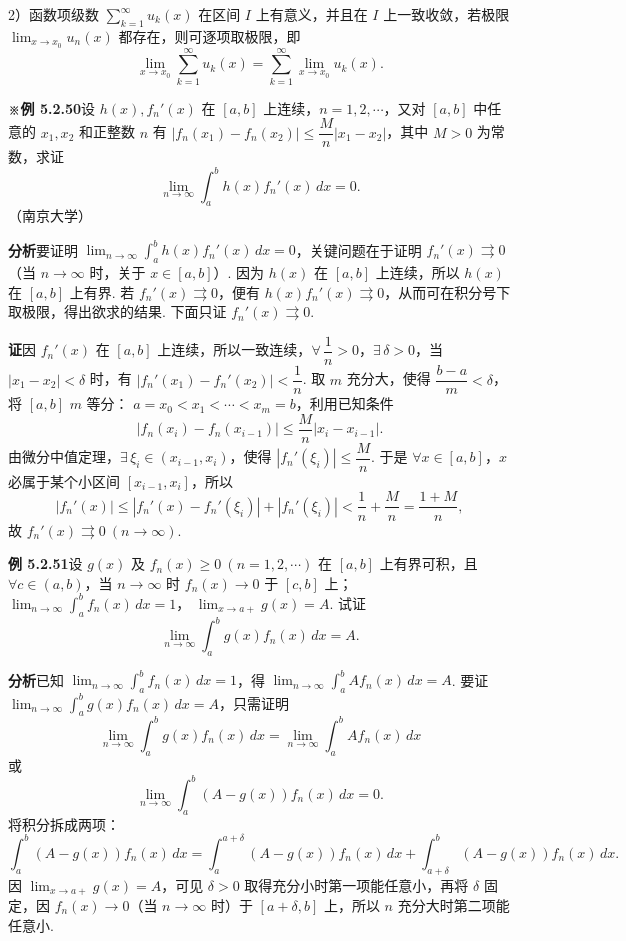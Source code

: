 \documentclass[UTF8, 12pt, fontset=fandol, oneside]{ctexart}
\begin{document}
2）函数项级数 $\displaystyle\sum_{k=1}^{\infty}u_k(x)$ 在区间 $I$ 上有意义，并且在 $I$ 上一致收敛，若极限
$\displaystyle\lim_{x\to x_0}u_n(x)$ 都存在，则可逐项取极限，即
\[
  \lim_{x\to x_0}\sum_{k=1}^{\infty}u_k(x)
  =\sum_{k=1}^{\infty}\lim_{x\to x_0}u_k(x).
\tag{C}
\]

\noindent\textbf{※例 5.2.50}\quad 设 $h(x),f_n'(x)$ 在 $[a,b]$ 上连续，$n=1,2,\cdots$，又对 $[a,b]$ 中任意的
$x_1,x_2$ 和正整数 $n$ 有
$|f_n(x_1)-f_n(x_2)|\le\dfrac Mn|x_1-x_2|$，其中 $M>0$ 为常数，求证
\[
  \lim_{n\to\infty}\int_a^b h(x)f_n'(x)\,dx=0.
\]
（南京大学）

\noindent\textbf{分析}\quad 要证明 $\displaystyle\lim_{n\to\infty}\int_a^b h(x)f_n'(x)\,dx=0$，关键问题在于证明
$f_n'(x)\rightrightarrows0$（当 $n\to\infty$ 时，关于 $x\in[a,b]$）. 因为 $h(x)$ 在 $[a,b]$ 上连续，所以
$h(x)$ 在 $[a,b]$ 上有界. 若 $f_n'(x)\rightrightarrows0$，便有
$h(x)f_n'(x)\rightrightarrows0$，从而可在积分号下取极限，得出欲求的结果. 下面只证
$f_n'(x)\rightrightarrows0$.

\noindent\textbf{证}\quad 因 $f_n'(x)$ 在 $[a,b]$ 上连续，所以一致连续，$\forall\,\dfrac1n>0$，$\exists\,\delta>0$，当
$|x_1-x_2|<\delta$ 时，有 $|f_n'(x_1)-f_n'(x_2)|<\dfrac1n$. 取 $m$ 充分大，使得
$\dfrac{b-a}{m}<\delta$，将 $[a,b]$ $m$ 等分：
$a=x_0<x_1<\cdots<x_m=b$，利用已知条件
\[
  |f_n(x_i)-f_n(x_{i-1})|\le\frac Mn|x_i-x_{i-1}|.
\]
由微分中值定理，$\exists\,\xi_i\in(x_{i-1},x_i)$，使得
$|f_n'(\xi_i)|\le\dfrac Mn$. 于是 $\forall x\in[a,b]$，$x$ 必属于某个小区间
$[x_{i-1},x_i]$，所以
\[
  |f_n'(x)|\le |f_n'(x)-f_n'(\xi_i)|+|f_n'(\xi_i)|
  <\frac1n+\frac Mn=\frac{1+M}{n},
\]
故 $f_n'(x)\rightrightarrows0\ (n\to\infty)$.

\noindent\textbf{例 5.2.51}\quad 设 $g(x)$ 及 $f_n(x)\ge0\ (n=1,2,\cdots)$ 在 $[a,b]$ 上有界可积，且
$\forall c\in(a,b)$，当 $n\to\infty$ 时 $f_n(x)\to0$ 于 $[c,b]$ 上；
$\displaystyle\lim_{n\to\infty}\int_a^b f_n(x)\,dx=1$，
$\displaystyle\lim_{x\to a+}g(x)=A$. 试证
\[
  \lim_{n\to\infty}\int_a^b g(x)f_n(x)\,dx=A.
\]

\noindent\textbf{分析}\quad 已知 $\displaystyle\lim_{n\to\infty}\int_a^b f_n(x)\,dx=1$，得
$\displaystyle\lim_{n\to\infty}\int_a^b Af_n(x)\,dx=A$. 要证
$\displaystyle\lim_{n\to\infty}\int_a^b g(x)f_n(x)\,dx=A$，只需证明
\[
  \lim_{n\to\infty}\int_a^b g(x)f_n(x)\,dx
  =\lim_{n\to\infty}\int_a^b Af_n(x)\,dx
\]
或
\[
  \lim_{n\to\infty}\int_a^b (A-g(x))f_n(x)\,dx=0.
\]
将积分拆成两项：
\[
  \int_a^b(A-g(x))f_n(x)\,dx
  =\int_a^{a+\delta}(A-g(x))f_n(x)\,dx
  +\int_{a+\delta}^b(A-g(x))f_n(x)\,dx.
\]
因 $\displaystyle\lim_{x\to a+}g(x)=A$，可见 $\delta>0$ 取得充分小时第一项能任意小，再将 $\delta$ 固定，因
$f_n(x)\to0$（当 $n\to\infty$ 时）于 $[a+\delta,b]$ 上，所以 $n$ 充分大时第二项能任意小.
\end{document}
